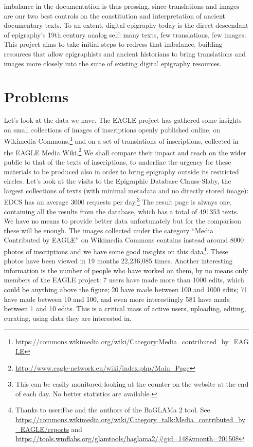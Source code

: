 \documentclass[amsthm,ebook]{saparticle}
\begin{document}
imbalance in the documentation is thus pressing, since translations and images are our two best controls on the constitution and interpretation of ancient documentary texts. To an extent, digital epigraphy today is the direct descendant of epigraphy’s 19th century analog self: many texts, few translations, few images. This project aims to take initial steps to redress that imbalance, building resources that allow epigraphists and ancient historians to bring translations and images more closely into the suite of existing digital epigraphy resources.



\section{Problems}
Let's look at the data we have. The EAGLE project has gathered some insights on small collections of images of inscriptions openly published online, on Wikimedia Commons,\footnote{\url{https://commons.wikimedia.org/wiki/Category:Media_contributed_by_EAGLE}} and on a set of translations of inscriptions, collected in the EAGLE Media Wiki.\footnote{\citet{Liuzzo2014} \url{http://www.eagle-network.eu/wiki/index.php/Main_Page}} We shall compare their impact and reach on the wider public to that of the texts of inscriptions, to underline the urgency for these materials to be produced also in order to bring epigraphy outside its restricted circles.
Let's look at the visits to the Epigraphic Database Clauss-Slaby, the largest collections of texts (with minimal metadata and no directly stored image): EDCS has an average 3000 requests per day.\footnote{This can be easily monitored looking at the counter on the website at the end of each day. No better statistics are available.} The result page is always one, containing all the results from the database, which has a total of 491353 texts. We have no means to provide better data unfortunately but for the comparison these will be enough. The images collected under the category ``Media Contributed by EAGLE'' on Wikimedia Commons contains instead around 8000 photos of inscriptions and we have some good insights on this data\footnote{Thanks to user:Fae and the authors of the BaGLAMa 2 tool. See \url{https://commons.wikimedia.org/wiki/Category_talk:Media_contributed_by_EAGLE/reports} and \url{https://tools.wmflabs.org/glamtools/baglama2/\#gid=148\&month=201508}}. These photos have been viewed in 19 months 22,236,085 times. Another interesting information is the number of people who have worked on them, by no means only members of the EAGLE project: 7 users have made more than 1000 edits, which could be anything above the figure; 20 have made between 100 and 1000 edits; 71 have made between 10 and 100, and even more interestingly 581 have made between 1 and 10 edits. This is a critical mass of active users, uploading, editing, curating, using data they are interested in. 
\end{document}
